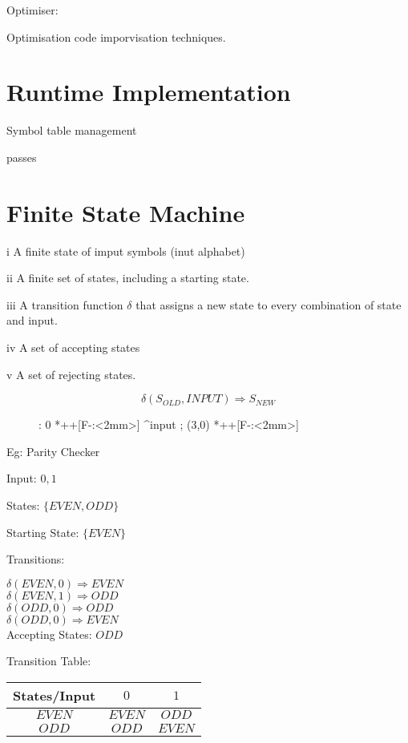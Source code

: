 \documentclass[a4paper,12pt]{article}
\begin{document}
Optimiser:

Optimisation code imporvisation techniques.


\section{Runtime Implementation}

Symbol table management

passes

\section{Finite State Machine}

i A finite state of imput symbols (inut alphabet)

ii A finite set of states, including a starting state.

iii A transition function  $\delta$ that assigns a new state to every
combination of state and input.

iv A set of accepting states

v A set of rejecting states.

\[ \delta(S_{OLD}, INPUT) \Rightarrow S_{NEW} \]

\begin{figure}[ht]

\xy <1cm,0cm>:
0 *++[F-:<2mm>] \ar ^{input} ; (3,0) *++[F-:<2mm>]
\endxy

\end{figure}

Eg: Parity Checker

Input: $0, 1$

States: $\{EVEN, ODD \}$

Starting State: $\{EVEN\}$

Transitions:	

$\delta(EVEN, 0) \Rightarrow EVEN $ \\
$\delta(EVEN, 1) \Rightarrow ODD $ \\
$\delta(ODD, 0) \Rightarrow ODD $ \\
$\delta(ODD, 0) \Rightarrow EVEN $ \\


Accepting States: ${ODD}$


Transition Table:

\begin{tabular}{|c|c|c|}
\hline
States/Input & $0$ 		& 	$1$ 	\\
\hline
$EVEN$		 & $EVEN$	& $ODD$	\\
\hline
$ODD$			 & $ODD$		& $EVEN$	\\
\hline
\end{tabular}
\end{document}

